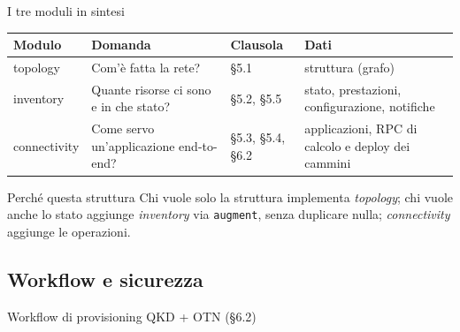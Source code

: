 \documentclass[10pt]{beamer}
\begin{document}
\begin{frame}{I tre moduli in sintesi}
  \small
  \begin{tabularx}{\textwidth}{@{}l L l L@{}}
    \toprule
    \textbf{Modulo} & \textbf{Domanda} & \textbf{Clausola} & \textbf{Dati} \\
    \midrule
    topology & Com'è fatta la rete? & §5.1 & struttura (grafo) \\
    inventory & Quante risorse ci sono e in che stato? & §5.2, §5.5 &
    stato, prestazioni, configurazione, notifiche \\
    connectivity & Come servo un'applicazione end-to-end? & §5.3, §5.4, §6.2 &
    applicazioni, RPC di calcolo e deploy dei cammini \\
    \bottomrule
  \end{tabularx}
  \vspace{3ex}
  \begin{exampleblock}{Perché questa struttura}
    Chi vuole solo la struttura implementa \emph{topology}; chi vuole anche
    lo stato aggiunge \emph{inventory} via \texttt{augment}, senza duplicare
    nulla; \emph{connectivity} aggiunge le operazioni.
  \end{exampleblock}
\end{frame}

\subsection{Workflow e sicurezza}

\begin{frame}{Workflow di provisioning QKD + OTN (§6.2)}
\end{frame}
\end{document}
